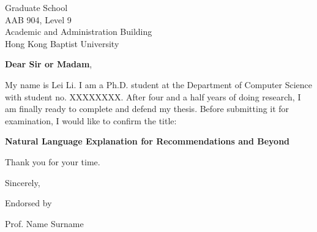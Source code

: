 \documentclass[10pt]{letter} %
\begin{document}

\begin{letter}{Graduate School \\ AAB 904, Level 9 \\ Academic and Administration Building \\ Hong Kong Baptist University} %


\opening{\textbf{Dear Sir or Madam},}

My name is Lei Li.
I am a Ph.D. student at the Department of Computer Science with student no. XXXXXXXX.
After four and a half years of doing research, I am finally ready to complete and defend my thesis.
Before submitting it for examination, I would like to confirm the title:

\begin{center}
\textbf{Natural Language Explanation for Recommendations and Beyond}
\end{center}

Thank you for your time.

\vspace{2\parskip} %
\closing{Sincerely,}
\vspace{2\parskip} %

Endorsed by

\vspace{2\parskip} %
\vspace{2\parskip} %

Prof. Name Surname




\end{letter}
 
\end{document}
